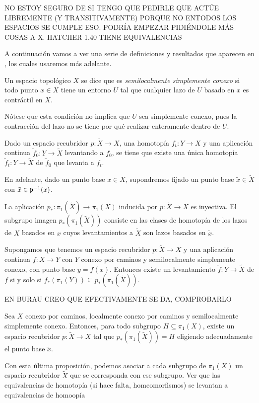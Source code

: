 \documentclass[TFG.tex]{subfiles}
\begin{document}
NO ESTOY SEGURO DE SI TENGO QUE PEDIRLE QUE ACTÚE LIBREMENTE (Y TRANSITIVAMENTE) PORQUE NO ENTODOS LOS ESPACIOS SE CUMPLE ESO. PODRÍA EMPEZAR PIDIÉNDOLE MÁS COSAS A X. HATCHER 1.40 TIENE EQUIVALENCIAS 

A continuación vamos a ver una serie de definiciones y resultados que aparecen en \cite{Hatcher}, los cuales usaremos más adelante.

\begin{defi}
Un espacio topológico $X$ se dice que es \emph{semilocalmente simplemente conexo} si todo punto $x\in X$ tiene un entorno $U$ tal que cualquier lazo de $U$ basado en $x$ es contráctil en $X$. 
\end{defi}
Nótese que esta condición no implica que $U$ sea simplemente conexo, pues la contracción del lazo no se tiene por qué realizar enteramente dentro de $U$.

\begin{prop}
Dado un espacio recubridor $p:\tilde{X}\to X$, una homotopía $f_t:Y\to X$ y una aplicación continua $\tilde{f}_0:Y\to\tilde{X}$ levantando a $f_0$, se tiene que existe una única homotopía $\tilde{f}_t:Y\to\tilde{X}$ de $\tilde{f}_0$ que levanta a $f_t$.
\end{prop}

En adelante, dado un punto base $x\in X$, supondremos fijado un punto base $\tilde{x}\in\tilde{X}$ con $\tilde{x}\in{\mathfrak{p}}^{-1}(x)$.

\begin{prop}
La aplicación $p_*:\pi_1(\tilde{X})\to\pi_1(X)$ inducida por $p:\tilde{X}\to X$ es inyectiva. El subgrupo imagen $p_*(\pi_1(\tilde{X}))$ consiste en las clases de homotopía de los lazos de $X$ basados en $x$ cuyos levantamientos a $\tilde{X}$ son lazos basados en $\tilde{x}$.
\end{prop}

\begin{prop}
Supongamos que tenemos un espacio recubridor $p:\tilde{X}\to X$ y una aplicación continua $f:X\to Y$ con $Y$ conexo por caminos y semilocalmente simplemente conexo, con punto base $y=f(x)$. Entonces existe un levantamiento $\tilde{f}:Y\to\tilde{X}$ de $f$ si y solo si $f_*(\pi_1(Y))\subseteq p_*(\pi_1(\tilde{X}))$.
\end{prop}
EN BURAU CREO QUE EFECTIVAMENTE SE DA, COMPROBARLO

\begin{prop}
Sea $X$ conexo por caminos, localmente conexo por caminos y semilocalmente simplemente conexo. Entonces, para todo subgrupo $H\subseteq \pi_1(X)$, existe un espacio recubridor $p:\tilde{X}\to X$ tal que $p_*(\pi_1(\tilde{X}))=H$ eligiendo adecuadamente el punto base $\tilde{x}$. 
\end{prop}

Con esta última proposición, podemos asociar a cada subgrupo de $\pi_1(X)$ un espacio recubridor $\tilde{X}$ que se corresponda con ese subgrupo.
Ver que las equivalencias de homotopía (si hace falta, homeomorfismos) se levantan a equivalencias de homoopía
\end{document}
